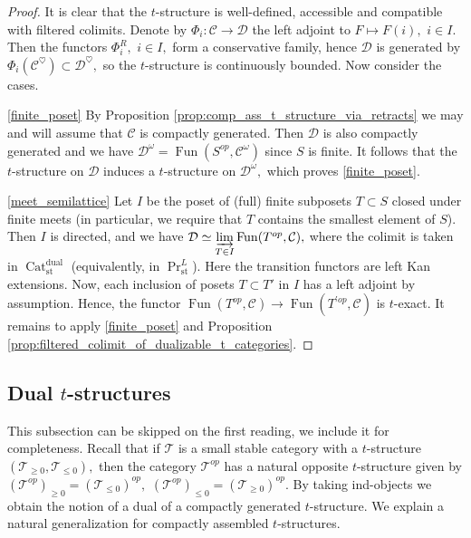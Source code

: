 \documentclass[11pt,leqno]{amsart}
\numberwithin{equation}{section}
\newcommand{\indlim}[1][]{\mathop{\varinjlim}\limits_{#1}}
\newcommand{\Cat}{\operatorname{Cat}}
\newcommand{\st}{\operatorname{st}}
\newcommand{\dual}{\operatorname{dual}}
\newcommand{\cD}{{\mathcal D}}
\newcommand{\cC}{{\mathcal C}}
\newcommand{\cT}{{\mathcal T}}
\newcommand{\Fun}{\operatorname{Fun}}
\begin{document}
\begin{proof}
It is clear that the $t$-structure is well-defined, accessible and compatible with filtered colimits. Denote by $\Phi_i:\cC\to\cD$ the left adjoint to $F\mapsto F(i),$ $i\in I.$ Then the functors $\Phi_i^R,$ $i\in I,$ form a conservative family, hence $\cD$ is generated by $\Phi_i(\cC^{\heartsuit})\subset\cD^{\heartsuit},$ so the $t$-structure is continuously bounded. Now consider the cases.

\ref{finite_poset} By Proposition \ref{prop:comp_ass_t_structure_via_retracts} we may and will assume that $\cC$ is compactly generated. Then $\cD$ is also compactly generated and we have $\cD^{\omega}=\Fun(S^{op},\cC^{\omega})$ since $S$ is finite. It follows that the $t$-structure on $\cD$ induces a $t$-structure on $\cD^{\omega},$ which proves \ref{finite_poset}. 

\ref{meet_semilattice} Let $I$ be the poset of (full) finite subposets $T\subset S$ closed under finite meets (in particular, we require that $T$ contains the smallest element of $S$). Then $I$ is directed, and we have $\cD\simeq \indlim[T\in I]\Fun(T^{op},\cC),$ where the colimit is taken in $\Cat_{\st}^{\dual}$ (equivalently, in $\Pr^L_{\st}$). Here the transition functors are left Kan extensions. Now, each inclusion of posets $T\subset T'$ in $I$ has a left adjoint by assumption. Hence, the functor $\Fun(T^{op},\cC)\to \Fun(T^{'op},\cC)$ is $t$-exact. It remains to apply \ref{finite_poset} and Proposition \ref{prop:filtered_colimit_of_dualizable_t_categories}.
\end{proof}

\subsection{Dual $t$-structures}

This subsection can be skipped on the first reading, we include it for completeness. Recall that if $\cT$ is a small stable category with a $t$-structure $(\cT_{\geq 0},\cT_{\leq 0}),$ then the category $\cT^{op}$ has a natural opposite $t$-structure given by $(\cT^{op})_{\geq 0}=(\cT_{\leq 0})^{op},$ $(\cT^{op})_{\leq 0}=(\cT_{\geq 0})^{op}.$ By taking ind-objects we obtain the notion of a dual of a compactly generated $t$-structure. We explain a natural generalization for compactly assembled $t$-structures.
\end{document}
